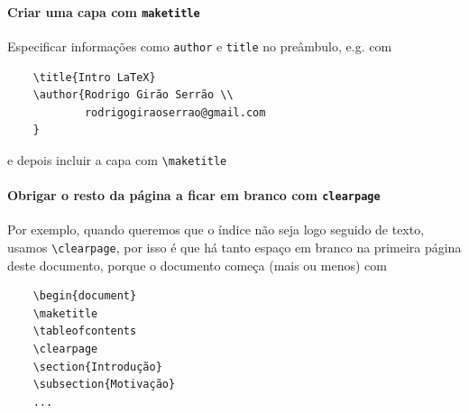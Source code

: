 \documentclass[11pt]{article}
\begin{document}
\paragraph{Criar uma capa com \texttt{maketitle}}
Especificar informações como \texttt{author} e \texttt{title} no preâmbulo,
e.g. com
\begin{verbatim}
    \title{Intro LaTeX}
    \author{Rodrigo Girão Serrão \\
            rodrigogiraoserrao@gmail.com
    }
\end{verbatim}
e depois incluir a capa com \verb|\maketitle|

\paragraph{Obrigar o resto da página a ficar em branco com \texttt{clearpage}}
Por exemplo, quando queremos que o índice não seja logo seguido de texto, usamos
\verb|\clearpage|, por isso é que há tanto espaço em branco na primeira página deste
documento, porque o documento começa (mais ou menos) com
\begin{verbatim}
    \begin{document}
    \maketitle
    \tableofcontents
    \clearpage
    \section{Introdução}
    \subsection{Motivação}
    ...
\end{verbatim}
\end{document}
